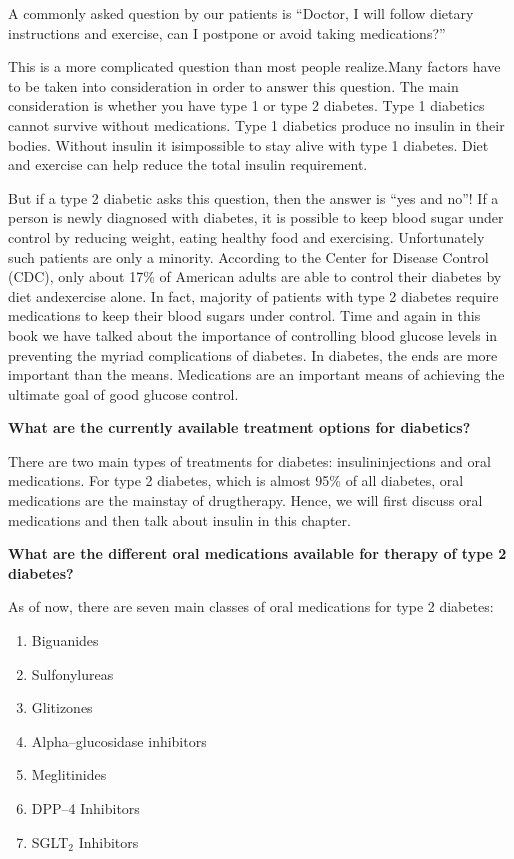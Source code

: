 A commonly asked question by our patients is “Doctor, I will follow dietary instructions and exercise, can I postpone or avoid taking medi\-cations?”

This is a more complicated question than most people realize.\break Many factors have to be taken into consideration in order to answer this question. The main consideration is whether you have type 1 or type 2 diabetes. Type 1 diabetics cannot survive without medications. Type 1 diabetics produce no insulin in their bodies. Without insulin it is\break impossible to stay alive with type 1 diabetes. Diet and exercise can help reduce the total insulin requirement.

But if a type 2 diabetic asks this question, then the answer is “yes and no”! If a person is newly diagnosed with diabetes, it is possible to keep blood sugar under control by reducing weight, eating healthy food and exercising. Unfortunately such patients are only a mino\-rity. According to the Center for Disease Control (CDC), only about 17\% of American adults are able to control their diabetes by diet and\break exercise alone. In fact, majority of patients with type 2 diabetes require medications to keep their blood sugars under control. Time and again in this book we have talked about the importance of controlling blood glucose levels in preventing the myriad complications of diabetes. In diabetes, the ends are more important than the means. Medications are an important means of achieving the ultimate goal of good glucose control.

\clearpage

\noindent\textbf{What are the currently available treatment options for diabetics?}

There are two main types of treatments for diabetes: insulin\break injections and oral medications. For type 2 diabetes, which is almost 95\% of all diabetes, oral medications are the mainstay of drug\break therapy. Hence, we will first discuss oral medications and then talk about insulin in this chapter.

\vskip 6pt

\noindent\textbf{What are the different oral medications available for therapy of type 2 diabetes?}

As of now, there are seven main classes of oral medications for type 2 diabetes:
\begin{enumerate}[•]
\itemsep=0pt
\item Biguanides
\item Sulfonylureas
\item Glitizones
\item Alpha–glucosidase inhibitors
\item Meglitinides
\item DPP–4 Inhibitors
\item SGLT$_{\text{2}}$ Inhibitors
\end{enumerate}

